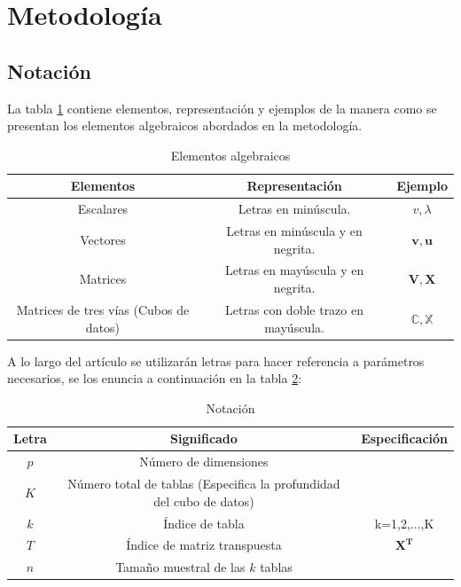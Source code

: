 \documentclass[water,article,submit,moreauthors,pdftex]{mdpi}
\begin{document}
\hypertarget{metodologuxeda}{%
\section{Metodología}\label{metodologuxeda}}

\hypertarget{notaciuxf3n}{%
\subsection{Notación}\label{notaciuxf3n}}

La tabla \ref{tab:notacion} contiene elementos, representación y
ejemplos de la manera como se presentan los elementos algebraicos
abordados en la metodología.

\begin{table}[!ht]
\begin{center}
 \begin{tabular}{||c ||c |c ||} 
 \hline
 Elementos & Representación & Ejemplo \\
 \hline\hline
 Escalares & Letras en minúscula. & $v,\lambda$\\
\hline
Vectores & Letras en minúscula y en negrita. & $\mathbf{v},\mathbf{u}$\\
\hline
Matrices & Letras en mayúscula y en negrita. & $\mathbf{V},\mathbf{X}$\\
\hline
Matrices de tres vías (Cubos de datos) & Letras con doble trazo en mayúscula. & $\mathbb{C},\mathbb{X}$\\
\hline
\end{tabular}\caption{Elementos algebraicos}
\label{tab:notacion}
\end{center}
\end{table}

A lo largo del artículo se utilizarán letras para hacer referencia a
parámetros necesarios, se los enuncia a continuación en la tabla
\ref{tab:notacion2}:

\begin{table}[!ht]
\begin{center}
 \begin{tabular}{||c ||c | c ||} 
 \hline
 Letra &  Significado & Especificación\\
 \hline\hline
 $p$ & Número de dimensiones &\\
\hline
 $K$ & Número total de tablas (Especifica la profundidad del cubo de datos) & \\
 \hline
 $k$ & Índice de tabla &  k=1,2,...,K\\
  \hline
 $T$ & Índice de matriz transpuesta &  $\mathbf{X^{T}}$\\
\hline
 $n$ & Tamaño muestral de las $k$ tablas &\\
\hline
\end{tabular}\caption{Notación}
\label{tab:notacion2}
\end{center}
\end{table}
\end{document}
